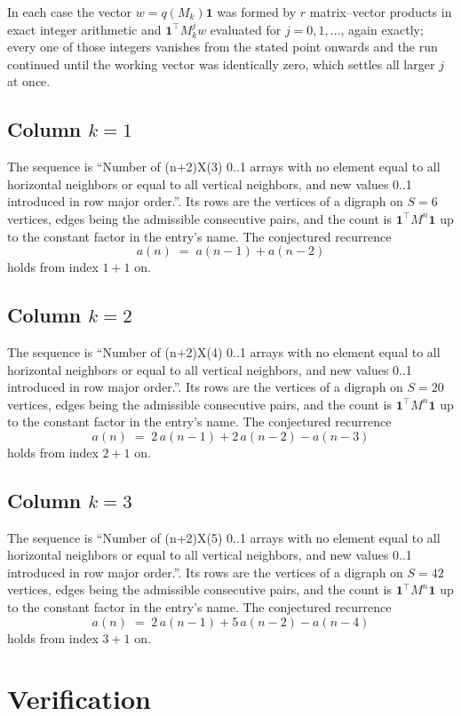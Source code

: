 \documentclass[11pt,a4paper]{article}
\theoremstyle{plain}
\theoremstyle{definition}
\begin{document}
In each case the vector $w=q(M_k)\mathbf{1}$ was formed by $r$ matrix--vector products in
exact integer arithmetic and $\mathbf{1}^{\!\top}M_k^{j}w$ evaluated for $j=0,1,\dots$,
again exactly; every one of those integers vanishes from the stated point onwards and the run
continued until the working vector was identically zero, which settles all larger $j$ at once.

\subsection*{Column $k$$=1$}
The sequence is ``Number of (n+2)X(3) 0..1 arrays with no element equal to all horizontal neighbors or equal to all vertical neighbors, and new values 0..1 introduced in row major order.''. Its rows are the vertices of a digraph on
$S=6$ vertices, edges being the admissible consecutive pairs, and the count is
$\mathbf{1}^{\!\top}M^{n}\mathbf{1}$ up to the constant factor in the entry's name.
The conjectured recurrence
\[
a(n)\;=\;a(n-1) + a(n-2)
\]
holds from index $1+1$ on.

\subsection*{Column $k$$=2$}
The sequence is ``Number of (n+2)X(4) 0..1 arrays with no element equal to all horizontal neighbors or equal to all vertical neighbors, and new values 0..1 introduced in row major order.''. Its rows are the vertices of a digraph on
$S=20$ vertices, edges being the admissible consecutive pairs, and the count is
$\mathbf{1}^{\!\top}M^{n}\mathbf{1}$ up to the constant factor in the entry's name.
The conjectured recurrence
\[
a(n)\;=\;2\,a(n-1) + 2\,a(n-2) - a(n-3)
\]
holds from index $2+1$ on.

\subsection*{Column $k$$=3$}
The sequence is ``Number of (n+2)X(5) 0..1 arrays with no element equal to all horizontal neighbors or equal to all vertical neighbors, and new values 0..1 introduced in row major order.''. Its rows are the vertices of a digraph on
$S=42$ vertices, edges being the admissible consecutive pairs, and the count is
$\mathbf{1}^{\!\top}M^{n}\mathbf{1}$ up to the constant factor in the entry's name.
The conjectured recurrence
\[
a(n)\;=\;2\,a(n-1) + 5\,a(n-2) - a(n-4)
\]
holds from index $3+1$ on.

\section{Verification}
\end{document}
